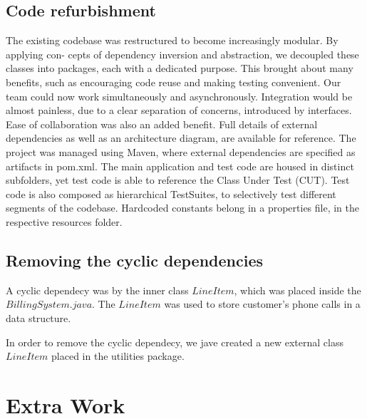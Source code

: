 \documentclass[11pt,twocolumn]{article} %
\begin{document}
\subsection{Code refurbishment}
The existing codebase was restructured to become increasingly modular. By applying con-
cepts of dependency inversion and abstraction, we decoupled these classes into packages,
each with a dedicated purpose.
This brought about many benefits, such as encouraging code reuse and making testing
convenient. Our team could now work simultaneously and asynchronously. Integration
would be almost painless, due to a clear separation of concerns, introduced by interfaces.
Ease of collaboration was also an added benefit.
Full details of external dependencies as well as an architecture diagram, are available for reference.
The project was managed using Maven, where external dependencies are specified as
artifacts in pom.xml. The main application and test code are housed in distinct subfolders,
yet test code is able to reference the Class Under Test (CUT). Test code is also composed
as hierarchical TestSuites, to selectively test different segments of the codebase. Hardcoded
constants belong in a properties file, in the respective resources folder.

\subsection{Removing the cyclic dependencies}
A cyclic dependecy was by the inner class $LineItem$, which was placed inside the $BillingSystem.java$.
The $LineItem$ was used to store customer's phone calls in a data structure.

In order to remove the cyclic dependecy, we jave created a new external class $LineItem$ placed in the 
utilities package.

\section{Extra Work}
\end{document}
